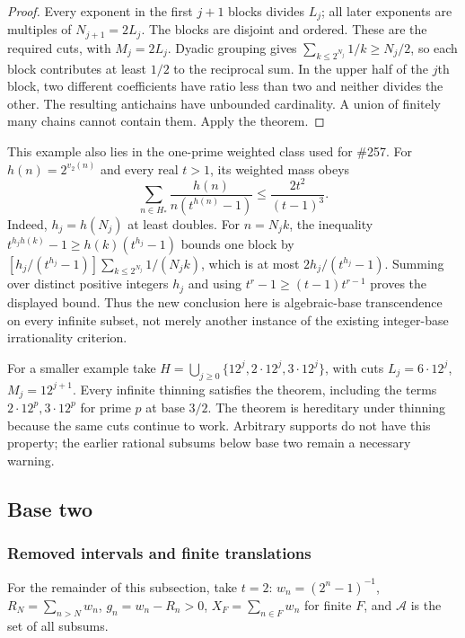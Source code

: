 \documentclass[11pt]{article}
\begin{document}
\begin{proof}
Every exponent in the first $j+1$ blocks divides $L_j$; all later
exponents are multiples of $N_{j+1}=2L_j$. The blocks are disjoint and
ordered. These are the required cuts, with $M_j=2L_j$. Dyadic grouping
gives $\sum_{k\le2^{N_j}}1/k\ge N_j/2$, so each block contributes at
least $1/2$ to the reciprocal sum. In the upper half of the $j$th block,
two different coefficients have ratio less than two and neither divides
the other. The resulting antichains have unbounded cardinality. A union
of finitely many chains cannot contain them. Apply the theorem.
\end{proof}

This example also lies in the one-prime weighted class used for \#257.
For $h(n)=2^{v_2(n)}$ and every real $t>1$, its weighted mass obeys
\[
 \sum_{n\in H_*}\frac{h(n)}{n(t^{h(n)}-1)}
 \le \frac{2t^2}{(t-1)^3}.
\]
Indeed, $h_j=h(N_j)$ at least doubles. For $n=N_jk$, the inequality
$t^{h_jh(k)}-1\ge h(k)(t^{h_j}-1)$ bounds one block by
$[h_j/(t^{h_j}-1)]\sum_{k\le2^{N_j}}1/(N_jk)$, which is at most
$2h_j/(t^{h_j}-1)$. Summing over distinct positive integers $h_j$ and
using $t^r-1\ge(t-1)t^{r-1}$ proves the displayed bound. Thus the new
conclusion here is algebraic-base transcendence on every infinite subset,
not merely another instance of the existing integer-base irrationality
criterion.

For a smaller example take
$H=\bigcup_{j\ge0}\{12^j,2\cdot12^j,3\cdot12^j\}$, with cuts
$L_j=6\cdot12^j$, $M_j=12^{j+1}$. Every infinite thinning satisfies the
theorem, including the terms $2\cdot12^p,3\cdot12^p$ for prime $p$ at
base $3/2$. The theorem is hereditary under thinning because the same
cuts continue to work. Arbitrary supports do not have this property;
the earlier rational subsums below base two remain a necessary warning.


\subsection{Base two}\label{sec:base2}

\subsubsection{Removed intervals and finite translations}\label{sec:lemmas}


For the remainder of this subsection, take $t=2$: $w_n=(2^n-1)^{-1}$,
$R_N=\sum_{n>N}w_n$, $g_n=w_n-R_n>0$, $X_F=\sum_{n\in F}w_n$ for finite $F$,
and $\mathcal A$ is the set of all subsums.
\end{document}
